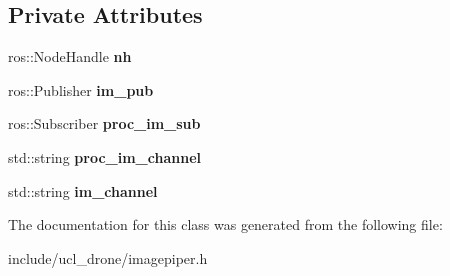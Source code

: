 \subsection*{Private Attributes}
\begin{DoxyCompactItemize}
\item 
\mbox{\label{classPiper_afb599607b355c0610279e5c1d54d1323}} 
ros\+::\+Node\+Handle {\bfseries nh}
\item 
\mbox{\label{classPiper_a78404fbe9057fac946b4da6ea34c3fd2}} 
ros\+::\+Publisher {\bfseries im\+\_\+pub}
\item 
\mbox{\label{classPiper_a0b43241f3a29aae0bd0d27855c82ce16}} 
ros\+::\+Subscriber {\bfseries proc\+\_\+im\+\_\+sub}
\item 
\mbox{\label{classPiper_a7cfdb3dc57d04ef0f1d0fed68f503a69}} 
std\+::string {\bfseries proc\+\_\+im\+\_\+channel}
\item 
\mbox{\label{classPiper_a03c36e2800823a9621a3ffc874065021}} 
std\+::string {\bfseries im\+\_\+channel}
\end{DoxyCompactItemize}


The documentation for this class was generated from the following file\+:\begin{DoxyCompactItemize}
\item 
include/ucl\+\_\+drone/imagepiper.\+h\end{DoxyCompactItemize}
